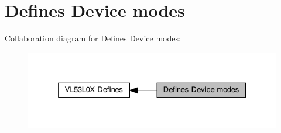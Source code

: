 \hypertarget{group__VL53L0X__define__DeviceModes__group}{}\section{Defines Device modes}
\label{group__VL53L0X__define__DeviceModes__group}
Collaboration diagram for Defines Device modes\+:\nopagebreak
\begin{figure}[H]
\begin{center}
\leavevmode
\includegraphics[width=325pt]{group__VL53L0X__define__DeviceModes__group}
\end{center}
\end{figure}
